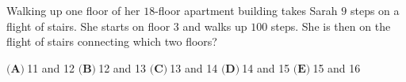 Walking up one floor of her $18$-floor apartment building takes Sarah $9$ steps on a flight of stairs. She starts on floor $3$ and walks up $100$ steps. She is then on the flight of stairs connecting which two floors?

$\textbf{(A)}\ $11 and 12 \qquad $\textbf{(B)}\ $12 and 13 \qquad $\textbf{(C)}\ $13 and 14 \qquad $\textbf{(D)}\ $14 and 15 \qquad $\textbf{(E)}\ $15 and 16
